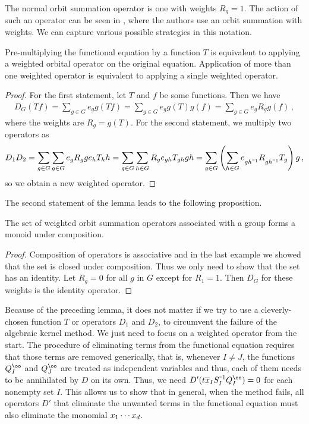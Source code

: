 The normal orbit summation operator is one with weights $R_g = 1$. The action of such an operator can be seen in \cite[p.~11]{wong2014confining}, where the authors use an orbit summation with weights. We can capture various possible strategies in this notation.

\begin{prop}Pre-multiplying the functional equation by a function $T$ is equivalent to applying a weighted orbital operator on the original equation. Application of more than one weighted operator is equivalent to applying a single weighted operator.
\end{prop}
\begin{proof} For the first statement, let $T$ and $f$ be some functions. Then we have
\begin{align}
	D_G(Tf) = \sum_{g\in G}e_g g(T f) = \sum_{g\in G} e_g g(T)g(f) =  \sum_{g\in G} e_gR_g g(f)\,,
\end{align}
where the weights are $R_g = g(T)$. For the second statement, we multiply two operators as
\begin{align}
	D_1D_2 = \sum_{g\in G}\sum_{g\in G} e_g R_g g e_h T_h h = \sum_{g\in G}\sum_{h\in G} R_g e_{gh}T_{gh} gh = \sum_{g\in G}\left(\sum_{h\in G} e_{gh^{\um 1}}R_{gh^{\um 1}} T_{g}\right) g\,,
\end{align}
so we obtain a new weighted operator.
\end{proof}

The second statement of the lemma leads to the following proposition.

\begin{prop} The set of weighted orbit summation operators associated with a group forms a monoid under composition.
\end{prop}
\begin{proof} Composition of operators is associative and in the last example we showed that the set is closed under composition. Thus we only need to show that the set has an identity. Let $R_g = 0$ for all $g$ in $G$ except for $R_1 = 1$. Then $D_G$ for these weights is the identity operator.
\end{proof}

Because of the preceding lemma, it does not matter if we try to use a cleverly-chosen function $T$ or operators $D_1$ and $D_2$, to circumvent the failure of the algebraic kernel method. We just need to focus on a weighted operator from the start. The procedure of eliminating terms from the functional equation requires that those terms are removed generically, that is, whenever $I \neq J$, the functions $Q_I^\oo$ and $Q_J^\oo$ are treated as independent variables and thus, each of them needs to be annihilated by $D$ on its own. Thus, we need $D'(t\ol x_I S_I^{\um 1}Q_I^\oo) = 0$ for each nonempty set $I$. This allows us to show that in general, when the method fails, all operators $D'$ that eliminate the unwanted terms in the functional equation must also eliminate the monomial $x_1\cdots x_d$. 

